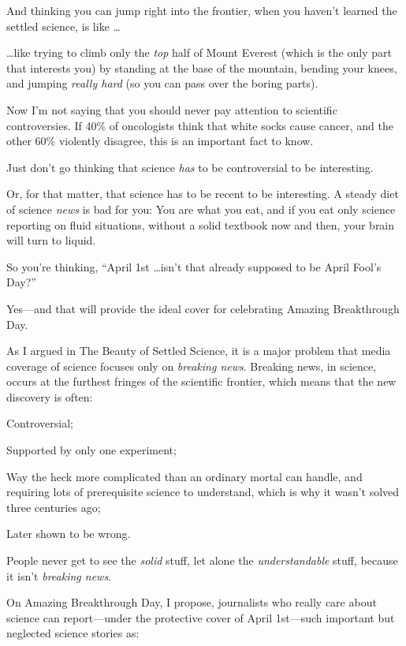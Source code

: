 {
 And thinking you can jump right into the frontier, when you
haven't learned the settled science, is like \ldots}

{
 \ldots like trying to climb only the \textit{top} half of Mount
Everest (which is the only part that interests you) by standing at the
base of the mountain, bending your knees, and jumping \textit{really
hard} (so you can pass over the boring parts).}

{
 Now I'm not saying that you should never pay
attention to scientific controversies. If 40\% of oncologists think
that white socks cause cancer, and the other 60\% violently disagree,
this is an important fact to know.}

{
 Just don't go thinking that science \textit{has}
to be controversial to be interesting.}

{
 Or, for that matter, that science has to be recent to be
interesting. A steady diet of science \textit{news} is bad for you: You
are what you eat, and if you eat only science reporting on fluid
situations, without a solid textbook now and then, your brain will turn
to liquid.}

\myendsectiontext


{
 So you're thinking, ``April 1st
\ldots isn't that already supposed to be April
Fool's Day?'' }

{
 Yes---and that will provide the ideal cover for celebrating
Amazing Breakthrough Day.}

{
 As I argued in The Beauty of Settled Science, it is a major
problem that media coverage of science focuses only on \textit{breaking
news}. Breaking news, in science, occurs at the furthest fringes of the
scientific frontier, which means that the new discovery is often:}

{
 Controversial;}

{
 Supported by only one experiment;}

{
 Way the heck more complicated than an ordinary mortal can handle,
and requiring lots of prerequisite science to understand, which is why
it wasn't solved three centuries ago;}

{
 Later shown to be wrong.}

{
 People never get to see the \textit{solid} stuff, let alone the
\textit{understandable} stuff, because it isn't
\textit{breaking news}.}

{
 On Amazing Breakthrough Day, I propose, journalists who really
care about science can report---under the protective cover of April
1st---such important but neglected science stories as:}

